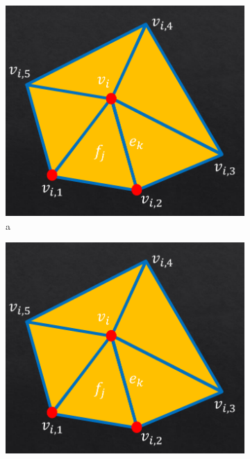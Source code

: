 \documentclass[12pt]{article} %
\begin{document}
\begin{figure}[!htb]
  \centering
  \begin{subfigure}[t]{0.24\linewidth}
      \begin{minipage}[b]{1\linewidth}
      \includegraphics[width=1\linewidth]{mesh.png}
      \caption{a}
      \end{minipage}
  \end{subfigure}
  \begin{subfigure}[t]{0.24\linewidth}
      \begin{minipage}[b]{1\linewidth}
      \includegraphics[width=1\linewidth]{mesh.png}

\end{minipage}
\end{subfigure}
\end{figure}
\end{document}

